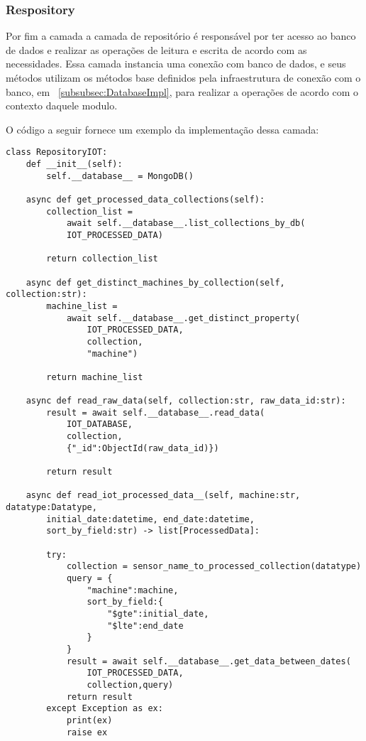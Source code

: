 \subsubsection{Respository}\label{subsubsec:repository}
Por fim a camada a camada de repositório é responsável por ter acesso ao banco de dados e realizar as operações de leitura e escrita de acordo com as necessidades. Essa camada instancia uma conexão com banco de dados, e seus métodos utilizam os métodos base definidos pela infraestrutura de conexão com o banco, em ~\ref{subsubsec:DatabaseImpl}, para realizar a operações de acordo com o contexto daquele modulo.

O código a seguir fornece um exemplo da implementação dessa camada:

\begin{verbatim}
class RepositoryIOT:
    def __init__(self):
        self.__database__ = MongoDB()
    
    async def get_processed_data_collections(self):
        collection_list = 
            await self.__database__.list_collections_by_db(
            IOT_PROCESSED_DATA)
    
        return collection_list
        
    async def get_distinct_machines_by_collection(self, collection:str):
        machine_list = 
            await self.__database__.get_distinct_property(
                IOT_PROCESSED_DATA,
                collection,
                "machine")

        return machine_list
    
    async def read_raw_data(self, collection:str, raw_data_id:str):
        result = await self.__database__.read_data(
            IOT_DATABASE,
            collection,
            {"_id":ObjectId(raw_data_id)})

        return result
    
    async def read_iot_processed_data__(self, machine:str, datatype:Datatype, 
        initial_date:datetime, end_date:datetime, 
        sort_by_field:str) -> list[ProcessedData]:
        
        try:
            collection = sensor_name_to_processed_collection(datatype)
            query = {
                "machine":machine,
                sort_by_field:{
                    "$gte":initial_date,
                    "$lte":end_date
                }
            }
            result = await self.__database__.get_data_between_dates(
                IOT_PROCESSED_DATA,
                collection,query)
            return result
        except Exception as ex:
            print(ex)
            raise ex
\end{verbatim}

